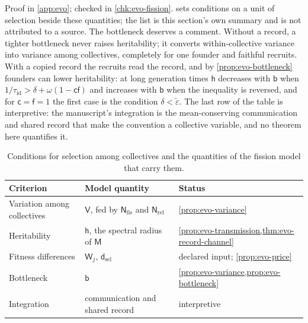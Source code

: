 Proof in \cref{app:evo}; checked in \cref{chk:evo-fission}.  sets conditions on a unit of selection beside these quantities; the list is this section's own summary and is not attributed to a source. The bottleneck deserves a comment. Without a record, a tighter bottleneck never raises heritability; it converts within-collective variance into variance among collectives, completely for one founder and faithful recruits. With a copied record the recruits read the record, and by \cref{prop:evo-bottleneck} founders can lower heritability: at long generation times $\mathsf h$ decreases with $\mathsf b$ when $1/\tau_{\mathrm{id}}>\delta+\omega(1-\mathsf c\mathsf f)$ and increases with $\mathsf b$ when the inequality is reversed, and for $\mathsf c=\mathsf f=1$ the first case is the condition $\delta<\tilde\varepsilon$. The last row of the table is interpretive: the manuscript's integration is the mean-conserving communication and shared record that make the convention a collective variable, and no theorem here quantifies it.

\begin{table}[t]
\centering\small
\begin{tabular}{@{}lll@{}}
\toprule
Criterion & Model quantity & Status\\
\midrule
Variation among collectives & $\mathsf V$, fed by $\mathsf N_{\mathrm{fis}}$ and $\mathsf N_{\mathrm{rel}}$ & \cref{prop:evo-variance}\\
Heritability & $\mathsf h$, the spectral radius of $\mathsf M$ & \cref{prop:evo-transmission,thm:evo-record-channel}\\
Fitness differences & $\mathsf W_j$, $\mathsf d_{\mathrm{sel}}$ & declared input; \cref{prop:evo-price}\\
Bottleneck & $\mathsf b$ & \cref{prop:evo-variance,prop:evo-bottleneck}\\
Integration & communication and shared record & interpretive\\
\bottomrule
\end{tabular}
\caption{Conditions for selection among collectives and the quantities of the fission model that carry them.}
\label{tab:evo-criteria}
\end{table}

